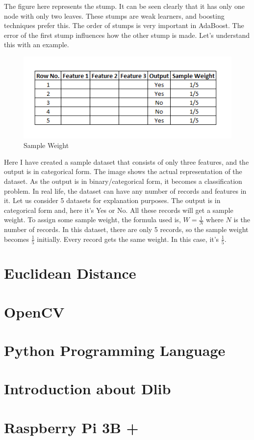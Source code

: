         The figure here represents the stump. It can be seen clearly that it has only one node with only two leaves. These stumps are weak learners, and boosting techniques prefer this. The order of stumps is very important in AdaBoost. 
        The error of the first stump influences how the other stump is made. Let's understand this with an example.
        \begin{figure}[H]
            \centering
            \includegraphics[width=0.6\linewidth]{img/sample-weight.png}
            \caption{Sample Weight}
        \end{figure}
        Here I have created a sample dataset that consists of only three features, and the output is in categorical form. The image shows the actual representation of the dataset. As the output is in binary/categorical form, it becomes a classification problem. In real life, the dataset can have any 
        number of records and features in it. Let us consider 5 datasets for explanation purposes. The output is in categorical form and, here it’s Yes or No. All these records will get a sample weight. To assign some sample weight, the formula used is, $W = \frac{1}{N}$ where $N$ is the number of records. In this dataset, 
        there are only 5 records, so the sample weight becomes $\frac{1}{5}$ initially. Every record gets the same weight. In this case, it’s $\frac{1}{5}$. 

\section{Euclidean Distance}

\section{OpenCV}

\section{Python Programming Language}

\section{Introduction about Dlib}

\section{Raspberry Pi 3B +}